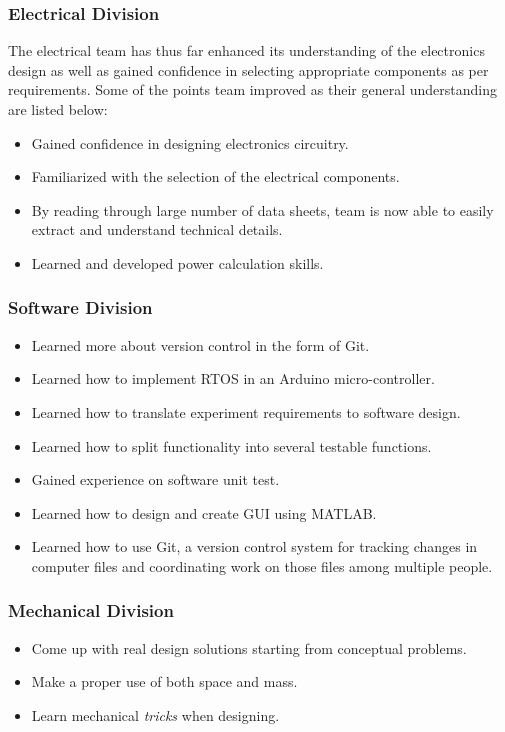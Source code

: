 \subsubsection{Electrical Division}
The electrical team has thus far enhanced its understanding of the electronics design as well as gained confidence in selecting appropriate components as per requirements. Some of the points team improved as their general understanding are listed below:  
\begin{itemize}

    \item Gained confidence in designing electronics circuitry.
    \item Familiarized with the selection of the electrical components. 
    \item By reading through large number of data sheets, team is now able to easily extract and understand technical details. 
    \item Learned and developed power calculation skills.
\end{itemize}


\subsubsection{Software Division}

\begin{itemize}
    \item Learned more about version control in the form of Git.
    \item Learned how to implement RTOS in an Arduino micro-controller.
    \item Learned how to translate experiment requirements to software design.
    \item Learned how to split functionality into several testable functions.
    \item Gained experience on software unit test.
    \item Learned how to design and create GUI using MATLAB.
    \item Learned how to use Git, a version control system for tracking changes in computer files and coordinating work on those files among multiple people.
\end{itemize}


\subsubsection{Mechanical Division}

\begin{itemize}
    \item Come up with real design solutions starting from conceptual problems.
    \item Make a proper use of both space and mass.
    \item Learn mechanical \textit{tricks} when designing. 
    
\end{itemize}


